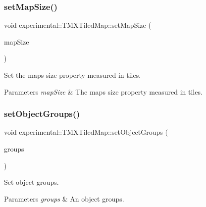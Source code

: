 \subsubsection{\texorpdfstring{set\+Map\+Size()}{setMapSize()}\hspace{0.1cm}{\footnotesize\ttfamily [2/2]}}
{\footnotesize\ttfamily void experimental\+::\+T\+M\+X\+Tiled\+Map\+::set\+Map\+Size (\begin{DoxyParamCaption}\item[{const \hyperlink{classSize}{Size} \&}]{map\+Size }\end{DoxyParamCaption})\hspace{0.3cm}{\ttfamily [inline]}}

Set the map\textquotesingle{}s size property measured in tiles.


\begin{DoxyParams}{Parameters}
{\em map\+Size} & The map\textquotesingle{}s size property measured in tiles. \\
\hline
\end{DoxyParams}
\mbox{\label{classexperimental_1_1TMXTiledMap_a8b7f577b6cf97be3da8b52da3ab4eede}} 
\subsubsection{\texorpdfstring{set\+Object\+Groups()}{setObjectGroups()}\hspace{0.1cm}{\footnotesize\ttfamily [1/2]}}
{\footnotesize\ttfamily void experimental\+::\+T\+M\+X\+Tiled\+Map\+::set\+Object\+Groups (\begin{DoxyParamCaption}\item[{const \hyperlink{classVector}{Vector}$<$ \hyperlink{classTMXObjectGroup}{T\+M\+X\+Object\+Group} $\ast$$>$ \&}]{groups }\end{DoxyParamCaption})\hspace{0.3cm}{\ttfamily [inline]}}

Set object groups.


\begin{DoxyParams}{Parameters}
{\em groups} & An object groups. \\
\hline
\end{DoxyParams}
\mbox{\label{classexperimental_1_1TMXTiledMap_a8b7f577b6cf97be3da8b52da3ab4eede}} 
